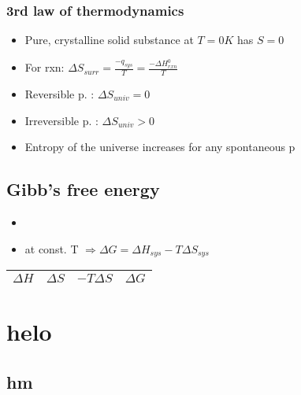 \documentclass[ wastespaceontitle, english]{cheat_sheet_template}
\begin{document}
        \subsubsection{3rd law of thermodynamics}
            \begin{itemize}
                \item Pure, crystalline solid substance at $T=0K$ has $S=0$
                \item For rxn: $\Delta S_{surr} = \frac{-q_{sys}}{T} = \frac{- \Delta H_{rxn}^0}{T}$
                \item Reversible p. : $\Delta S_{univ} =0$
                \item Irreversible p. : $\Delta S_{univ} > 0$
                \item Entropy of the universe increases for any spontaneous p
            \end{itemize}
    \subsection{Gibb's free energy}
        \begin{itemize}
            \item {}
            \item at const. T $ \Rightarrow \Delta G= \Delta H_{sys} - T \Delta S_{sys}$
        \end{itemize}
        \begin{tabular*}{\linewidth}{l l l l}
            $\Delta H$ & $\Delta S$ & $- T \Delta S$ & $\Delta G$ \\
            \hline
        \end{tabular*}

\lipsum
\section{helo}
\subsection{hm}
\lipsum
\end{document}
